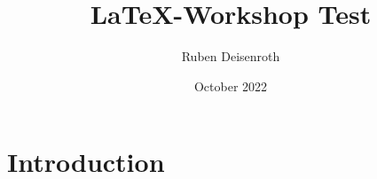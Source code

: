 \documentclass{article}
\title{LaTeX-Workshop Test}
\author{Ruben Deisenroth}
\date{October 2022}
\begin{document}
    \maketitle

    \section{Introduction}
\end{document}
